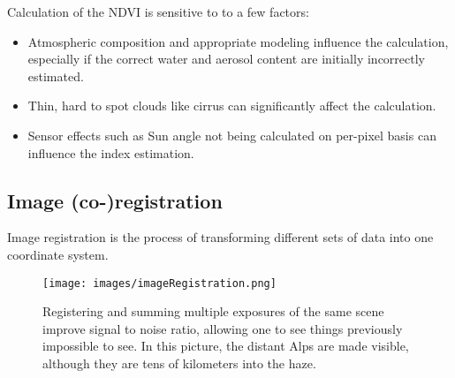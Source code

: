 Calculation of the NDVI is sensitive to to a few factors:
\begin{itemize}
    \item Atmospheric composition and appropriate modeling influence the calculation, especially if the correct water and aerosol content are initially incorrectly estimated.
    \item Thin, hard to spot clouds like cirrus can significantly affect the calculation.
    \item Sensor effects such as Sun angle not being calculated on per-pixel basis can influence the index estimation.
\end{itemize}



\subsection{Image (co-)registration}
Image registration is the process of transforming different sets of data into one coordinate system.

\begin{figure}[H]
\centering
\texttt{[image: images/imageRegistration.png]}
\caption{Registering and summing multiple exposures of the same scene improve signal to noise ratio, allowing one to see things previously impossible to see. In this picture, the distant Alps are made visible, although they are tens of kilometers into the haze.}
\end{figure}